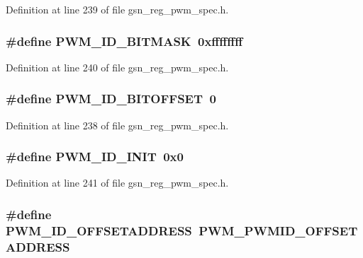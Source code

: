 Definition at line 239 of file gsn\_\-reg\_\-pwm\_\-spec.h.

\hypertarget{a00565_a69479612854fb302d76c4ee1c308095c}{
\subsubsection[{PWM\_\-ID\_\-BITMASK}]{\setlength{\rightskip}{0pt plus 5cm}\#define PWM\_\-ID\_\-BITMASK~0xffffffff}}
\label{a00565_a69479612854fb302d76c4ee1c308095c}


Definition at line 240 of file gsn\_\-reg\_\-pwm\_\-spec.h.

\hypertarget{a00565_a980cbc74448c168119540aa7e63b2314}{
\subsubsection[{PWM\_\-ID\_\-BITOFFSET}]{\setlength{\rightskip}{0pt plus 5cm}\#define PWM\_\-ID\_\-BITOFFSET~0}}
\label{a00565_a980cbc74448c168119540aa7e63b2314}


Definition at line 238 of file gsn\_\-reg\_\-pwm\_\-spec.h.

\hypertarget{a00565_a0b1a1bbe9036e85057cf408ef7327bb8}{
\subsubsection[{PWM\_\-ID\_\-INIT}]{\setlength{\rightskip}{0pt plus 5cm}\#define PWM\_\-ID\_\-INIT~0x0}}
\label{a00565_a0b1a1bbe9036e85057cf408ef7327bb8}


Definition at line 241 of file gsn\_\-reg\_\-pwm\_\-spec.h.

\hypertarget{a00565_a633098a5cae368212040cfe0f285a2e0}{
\subsubsection[{PWM\_\-ID\_\-OFFSETADDRESS}]{\setlength{\rightskip}{0pt plus 5cm}\#define PWM\_\-ID\_\-OFFSETADDRESS~PWM\_\-PWMID\_\-OFFSETADDRESS}}
\label{a00565_a633098a5cae368212040cfe0f285a2e0}


